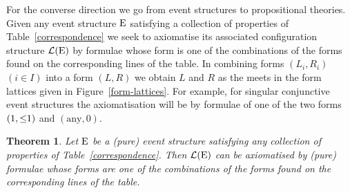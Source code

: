 \documentclass[twocolumn]{article}
\newtheorem{theo}{Theorem}
\newenvironment{theorem}[1]{\begin{theo} \rm \label{th-#1} }{\end{theo}}
\begin{document}
For the converse direction we go from event structures to
propositional theories.  Given any event structure ${\rm E}$ satisfying
a collection of properties of Table~\ref{correspondence} we seek to
axiomatise its associated configuration structure ${\cal L}({\rm E})$ by
formulae whose form is one of the combinations of the forms found on
the corresponding lines of the table.  
In combining forms $(L_i,R_i)$ $(i \in I)$ into a form $(L,R)$ we
obtain $L$ and $R$ as the meets in the form lattices
given in Figure~\ref{form-lattices}.
For example, for singular conjunctive event
structures the axiomatisation will be by formulae of one
of the two forms $(1,\leq\hspace{-3pt}1)$ and $(\mbox{any},0)$.

\begin{theorem}{EtoT}
Let ${\rm E}$ be a (pure) event structure satisfying any collection of
properties of Table~\ref{correspondence}. Then ${\cal L}({\rm E})$ can be
axiomatised by (pure) formulae whose forms are one of the combinations of the
forms found on the corresponding lines of the table.
\end{theorem}
\end{document}
